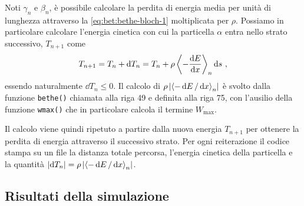         Noti $\gamma_n$ e $\beta_n$, è possibile calcolare la perdita di energia media per unità di lunghezza attraverso la \eqref{eq:bet:bethe-bloch-1} moltiplicata per $\rho$. Possiamo in particolare calcolare l'energia cinetica con cui la particella $\alpha$ entra nello strato successivo, $T_{n + 1}$ come
        \begin{equation*}
            T_{n + 1} = T_n + \dd{T_n} = T_n + \rho\, {\left\langle - \dv{E}{x} \right\rangle}_n \dd{s}
            \,,
        \end{equation*}
        essendo naturalmente $\dd{T_n} \leq 0$. Il calcolo di $\rho\,\abs{{\left\langle - \dd{E} / \dd{x} \right\rangle}_n}$ è svolto dalla funzione \texttt{bethe()} chiamata alla riga 49 e definita alla riga 75, con l'ausilio della funzione \texttt{wmax()} che in particolare calcola il termine $W_\text{max}$.

        Il calcolo viene quindi ripetuto a partire dalla nuova energia $T_{n + 1}$ per ottenere la perdita di energia attraverso il successivo strato. Per ogni reiterazione il codice stampa su un file la distanza totale percorsa, l'energia cinetica della particella e la quantità $\abs{\dd{T_n}} = \rho\,\abs{{\left\langle - \dd{E} / \dd{x} \right\rangle}_n}$.

    \subsection{Risultati della simulazione}
